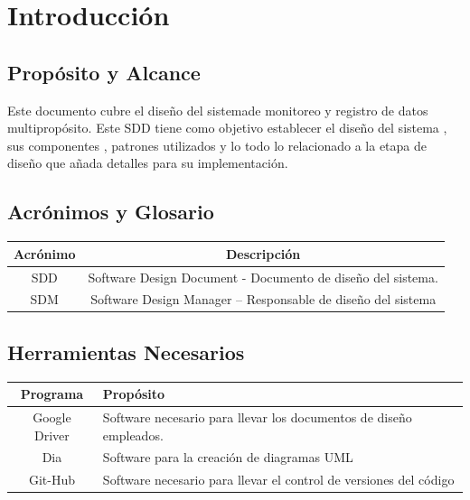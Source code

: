\section{\textcolor[gray]{.2}{Introducción}}
\subsection{\textcolor[gray]{.2}{Propósito y Alcance}}
Este documento cubre el diseño del sistemade monitoreo y registro de datos multipropósito. Este SDD tiene como objetivo establecer el diseño del sistema , sus componentes , patrones utilizados y lo todo lo relacionado a la etapa de diseño que añada detalles para su implementación. 

\subsection{\textcolor[gray]{.2}{Acrónimos y Glosario}}
\begin{table}[!h]
\begin{center}
\begin{tabular}{|c|c|}
\hline
\rowcolor[gray]{.8} Acrónimo & Descripción \\
\hline
SDD & Software Design Document - Documento de diseño del sistema. \\
\hline
SDM & Software Design Manager – Responsable de diseño del sistema\\
\hline
\end{tabular}
\end{center}
\end{table}

\subsection{\textcolor[gray]{.2}{Herramientas Necesarios}}
\begin{table}[!h]
\begin{center}
\begin{tabular}{|c|p{100mm}|}
\hline
\rowcolor[gray]{.8} Programa & Propósito \\
\hline
Google Driver & Software necesario para llevar los documentos de diseño empleados.\\
\hline
Dia & Software para la creación de diagramas UML\\
\hline
Git-Hub & Software necesario para llevar el control de versiones del código \\
\hline
\end{tabular}
\end{center}
\end{table}

